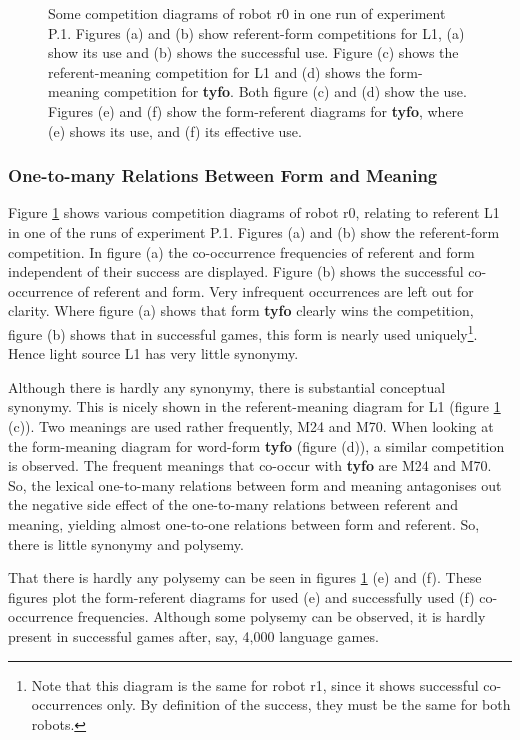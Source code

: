 \begin{figure}
\caption{Some competition diagrams of robot r0 in one run of experiment P.1. Figures (a) and (b) show referent-form competitions for L1, (a) show its use and (b) shows the successful use. Figure (c) shows the referent-meaning competition for L1 and (d) shows the form-meaning competition for {\bf tyfo}. Both figure (c) and (d) show the use. Figures (e) and (f) show the form-referent diagrams for {\bf tyfo}, where (e) shows its use, and (f) its effective use.}
\label{f:opt:ggcomp1}
\end{figure}

\subsubsection{One-to-many Relations Between Form and Meaning}

Figure \ref{f:opt:ggcomp1} shows various competition diagrams of robot r0, relating to referent L1 in one of the runs of experiment P.1. Figures (a) and (b) show the referent-form competition. In figure (a) the co-occurrence frequencies of referent and form independent of their success are displayed. Figure (b) shows the successful co-occurrence of referent and form. Very infrequent occurrences are left out for clarity. Where figure (a) shows that form {\bf tyfo} clearly wins the competition, figure (b) shows that  in successful games, this form is nearly used uniquely\footnote{Note that this diagram is the same for robot r1, since it shows successful co-occurrences only. By definition of the success, they must be the same for both robots.}. Hence light source L1 has very little synonymy. 

Although there is hardly any synonymy, there is substantial conceptual synonymy. This is nicely shown in the referent-meaning diagram for L1 (figure \ref{f:opt:ggcomp1} (c)). Two meanings are used rather frequently, M24 and M70. When looking at the form-meaning diagram for word-form {\bf tyfo} (figure (d)), a similar competition is observed. The frequent meanings that co-occur with {\bf tyfo} are M24 and M70. So, the lexical one-to-many relations between form and meaning antagonises out the negative side effect of the one-to-many relations between referent and meaning, yielding almost one-to-one relations between form and referent. So, there is little synonymy and polysemy. 

That there is hardly any polysemy can be seen in figures \ref{f:opt:ggcomp1} (e) and (f). These figures plot the form-referent diagrams for used (e) and successfully used (f) co-occurrence frequencies. Although some polysemy can be observed, it is hardly present in successful games after, say, 4,000 language games.


